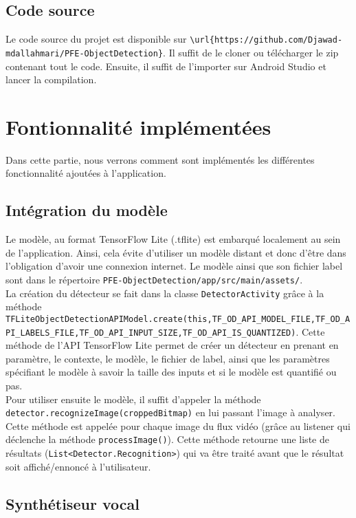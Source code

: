 \documentclass[UTF8]{EPURapport}
\begin{document}
\section{Code source}
Le code source du projet est disponible sur \verb|\url{https://github.com/Djawad-mdallahmari/PFE-ObjectDetection}|. Il suffit de le cloner ou télécharger le zip contenant tout le code. Ensuite, il suffit de l'importer sur Android Studio et lancer la compilation.

\chapter{Fontionnalité implémentées}
Dans cette partie, nous verrons comment sont implémentés les différentes fonctionnalité ajoutées à l'application.

\section{Intégration du modèle}

Le modèle, au format TensorFlow Lite (.tflite) est embarqué localement au sein de l'application. Ainsi, cela évite d'utiliser un modèle distant et donc d'être dans l'obligation d'avoir une connexion internet. Le modèle ainsi que son fichier label sont dans le répertoire \verb|PFE-ObjectDetection/app/src/main/assets/|.\\

La création du détecteur se fait dans la classe \verb|DetectorActivity| grâce à la méthode \verb|TFLiteObjectDetectionAPIModel.create(this,TF_OD_API_MODEL_FILE,TF_OD_API_LABELS_FILE,TF_OD_API_INPUT_SIZE,TF_OD_API_IS_QUANTIZED)|. Cette méthode de l'API TensorFlow Lite permet de créer un détecteur en prenant en paramètre, le contexte, le modèle, le fichier de label, ainsi que les paramètres spécifiant le modèle à savoir la taille des inputs et si le modèle est quantifié ou pas. \\

Pour utiliser ensuite le modèle, il suffit d'appeler la méthode \verb|detector.recognizeImage(croppedBitmap)| en lui passant l'image à analyser. Cette méthode est appelée pour chaque image du flux vidéo (grâce au listener qui déclenche la méthode \verb|processImage()|). Cette méthode retourne une liste de résultats (\verb|List<Detector.Recognition>|) qui va être traité avant que le résultat soit affiché/ennoncé à l'utilisateur.

\section{Synthétiseur vocal}
\end{document}
